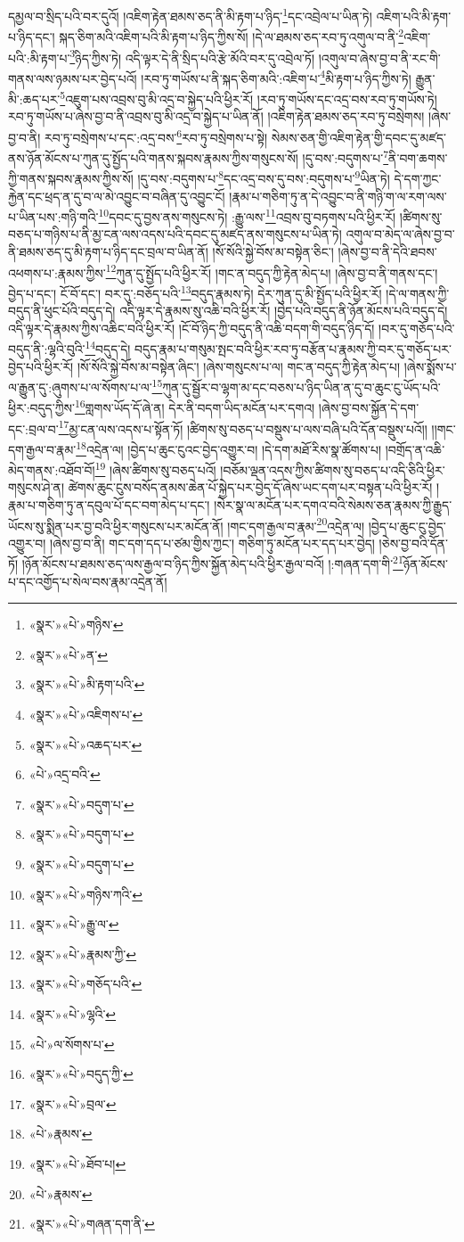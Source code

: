 དམྱལ་བ་སྲིད་པའི་བར་དུའོ། །འཇིག་རྟེན་ཐམས་ཅད་ནི་མི་རྟག་པ་ཉིད་\footnote{«སྣར་»«པེ་»གཉིས་}དང་འབྲེལ་པ་ཡིན་ཏེ། འཇིག་པའི་མི་རྟག་པ་ཉིད་དང་། སྐད་ཅིག་མའི་འཇིག་པའི་མི་རྟག་པ་ཉིད་ཀྱིས་སོ། །དེ་ལ་ཐམས་ཅད་རབ་ཏུ་འགུལ་བ་ནི་\footnote{«སྣར་»«པེ་»ན་}འཇིག་པའི་:མི་རྟག་པ་\footnote{«སྣར་»«པེ་»མི་རྟག་པའི་}ཉིད་ཀྱིས་ཏེ། འདི་ལྟར་དེ་ནི་སྲིད་པའི་རྩེ་མོའི་བར་དུ་འབྲེལ་ཏོ། །འགུལ་བ་ཞེས་བྱ་བ་ནི་རང་གི་གནས་ལས་ཉམས་པར་བྱེད་པའོ། །རབ་ཏུ་གཡོས་པ་ནི་སྐད་ཅིག་མའི་:འཇིག་པ་\footnote{«སྣར་»«པེ་»འཇིགས་པ་}མི་རྟག་པ་ཉིད་ཀྱིས་ཏེ། རྒྱུན་མི་:ཆད་པར་\footnote{«སྣར་»«པེ་»འཆད་པར་}འཇུག་པས་འབྲས་བུ་མི་འདྲ་བ་སྐྱེད་པའི་ཕྱིར་རོ། །རབ་ཏུ་གཡོས་དང་འདྲ་བས་རབ་ཏུ་གཡོས་ཏེ། རབ་ཏུ་གཡོས་པ་ཞེས་བྱ་བ་ནི་འབྲས་བུ་མི་འདྲ་བ་སྐྱེད་པ་ཡིན་ནོ། །འཇིག་རྟེན་ཐམས་ཅད་རབ་ཏུ་བསྲེགས། །ཞེས་བྱ་བ་ནི། རབ་ཏུ་བསྲེགས་པ་དང་:འདྲ་བས་\footnote{«པེ་»འདྲ་བའི་}རབ་ཏུ་བསྲེགས་པ་སྟེ། སེམས་ཅན་གྱི་འཇིག་རྟེན་གྱི་དབང་དུ་མཛད་ནས་ཉོན་མོངས་པ་ཀུན་དུ་སྤྱོད་པའི་གནས་སྐབས་རྣམས་ཀྱིས་གསུངས་སོ། །དུ་བས་:བདུགས་པ་\footnote{«སྣར་»«པེ་»བདུག་པ་}ནི་བག་ཆགས་ཀྱི་གནས་སྐབས་རྣམས་ཀྱིས་སོ། །དུ་བས་:བདུགས་པ་\footnote{«སྣར་»«པེ་»བདུག་པ་}དང་འདྲ་བས་དུ་བས་:བདུགས་པ་\footnote{«སྣར་»«པེ་»བདུག་པ་}ཡིན་ཏེ། དེ་དག་ཀྱང་རྐྱེན་དང་ཕྲད་ན་དུ་བ་ལ་མེ་འབྱུང་བ་བཞིན་དུ་འབྱུང་ངོ། །རྣམ་པ་གཅིག་ཏུ་ན་དེ་འབྱུང་བ་ནི་གཉི་ག་ལ་རག་ལས་པ་ཡིན་པས་:གཉི་གའི་\footnote{«སྣར་»«པེ་»གཉིས་ཀའི་}དབང་དུ་བྱས་ནས་གསུངས་ཏེ། :རྒྱུ་ལས་\footnote{«སྣར་»«པེ་»རྒྱུ་ལ་}འབྲས་བུ་བཏགས་པའི་ཕྱིར་རོ། །ཚིགས་སུ་བཅད་པ་གཉིས་པ་ནི་མྱ་ངན་ལས་འདས་པའི་དབང་དུ་མཛད་ནས་གསུངས་པ་ཡིན་ཏེ། འགུལ་བ་མེད་ལ་ཞེས་བྱ་བ་ནི་ཐམས་ཅད་དུ་མི་རྟག་པ་ཉིད་དང་བྲལ་བ་ཡིན་ནོ། །སོ་སོའི་སྐྱེ་བོས་མ་བསྟེན་ཅིང་། །ཞེས་བྱ་བ་ནི་དེའི་ཐབས་འཕགས་པ་:རྣམས་ཀྱིས་\footnote{«སྣར་»«པེ་»རྣམས་ཀྱི་}ཀུན་དུ་སྤྱོད་པའི་ཕྱིར་རོ། །གང་ན་བདུད་ཀྱི་རྟེན་མེད་པ། །ཞེས་བྱ་བ་ནི་གནས་དང་། བྱེད་པ་དང་། ངོ་བོ་དང་། བར་དུ་:བཅོད་པའི་\footnote{«སྣར་»«པེ་»གཅོད་པའི་}བདུད་རྣམས་ཏེ། དེར་ཀུན་དུ་མི་སྤྱོད་པའི་ཕྱིར་རོ། །དེ་ལ་གནས་ཀྱི་བདུད་ནི་ཕུང་པོའི་བདུད་དེ། འདི་ལྟར་དེ་རྣམས་སུ་འཆི་བའི་ཕྱིར་རོ། །བྱེད་པའི་བདུད་ནི་ཉོན་མོངས་པའི་བདུད་དེ། འདི་ལྟར་དེ་རྣམས་ཀྱིས་འཆིང་བའི་ཕྱིར་རོ། །ངོ་བོ་ཉིད་ཀྱི་བདུད་ནི་འཆི་བདག་གི་བདུད་ཉིད་དོ། །བར་དུ་གཅོད་པའི་བདུད་ནི་:ལྷའི་བུའི་\footnote{«སྣར་»«པེ་»ལྷའི་}བདུད་དེ། བདུད་རྣམ་པ་གསུམ་སྤང་བའི་ཕྱིར་རབ་ཏུ་བརྩོན་པ་རྣམས་ཀྱི་བར་དུ་གཅོད་པར་བྱེད་པའི་ཕྱིར་རོ། །སོ་སོའི་སྐྱེ་བོས་མ་བསྟེན་ཞིང་། །ཞེས་གསུངས་པ་ལ། གང་ན་བདུད་ཀྱི་རྟེན་མེད་པ། །ཞེས་སྨོས་པ་ལ་རྒྱུན་དུ་:ཞུགས་པ་ལ་སོགས་པ་ལ་\footnote{«པེ་»ལ་སོགས་པ་}ཀུན་དུ་སྦྱོར་བ་ལྷག་མ་དང་བཅས་པ་ཉིད་ཡིན་ན་དུ་བ་ཆུང་ངུ་ཡོད་པའི་ཕྱིར་:བདུད་ཀྱིས་\footnote{«སྣར་»«པེ་»བདུད་ཀྱི་}གླགས་ཡོད་དོ་ཞེ་ན། དེར་ནི་བདག་ཡིད་མངོན་པར་དགའ། །ཞེས་བྱ་བས་སྐྱོན་དེ་དག་དང་:བྲལ་བ་\footnote{«སྣར་»«པེ་»བྲལ་}མྱ་ངན་ལས་འདས་པ་སྟོན་ཏོ། །ཚིགས་སུ་བཅད་པ་བསྡུས་པ་ལས་བཞི་པའི་དོན་བསྡུས་པའོ།། །།གང་དག་རྒྱལ་བ་རྣམ་\footnote{«པེ་»རྣམས་}འདྲེན་ལ། །བྱེད་པ་ཆུང་ངུའང་བྱེད་འགྱུར་བ། །དེ་དག་མཐོ་རིས་སྣ་ཚོགས་པ། །བགྲོད་ན་འཆི་མེད་གནས་:འཐོབ་བོ།\footnote{«སྣར་»«པེ་»ཐོབ་པ།} །ཞེས་ཚིགས་སུ་བཅད་པའོ། །བཅོམ་ལྡན་འདས་ཀྱིས་ཚིགས་སུ་བཅད་པ་འདི་ཅིའི་ཕྱིར་གསུངས་ཤེ་ན། ཚེགས་ཆུང་ངུས་བསོད་ནམས་ཆེན་པོ་སྐྱེད་པར་བྱེད་དོ་ཞེས་ཡང་དག་པར་བསྟན་པའི་ཕྱིར་རོ། །རྣམ་པ་གཅིག་ཏུ་ན་དབུལ་པོ་དང་བག་མེད་པ་དང་། །སེར་སྣ་ལ་མངོན་པར་དགའ་བའི་སེམས་ཅན་རྣམས་ཀྱི་རྒྱུད་ཡོངས་སུ་སྨིན་པར་བྱ་བའི་ཕྱིར་གསུངས་པར་མངོན་ནོ། །གང་དག་རྒྱལ་བ་རྣམ་\footnote{«པེ་»རྣམས་}འདྲེན་ལ། །བྱེད་པ་ཆུང་ངུ་བྱེད་འགྱུར་བ། །ཞེས་བྱ་བ་ནི། གང་དག་དད་པ་ཙམ་གྱིས་ཀྱང་། གཅིག་ཏུ་མངོན་པར་དད་པར་བྱེད། །ཅེས་བྱ་བའི་དོན་ཏོ། །ཉོན་མོངས་པ་ཐམས་ཅད་ལས་རྒྱལ་བ་ཉིད་ཀྱིས་སྐྱོན་མེད་པའི་ཕྱིར་རྒྱལ་བའོ། །:གཞན་དག་གི་\footnote{«སྣར་»«པེ་»གཞན་དག་ནི་}ཉོན་མོངས་པ་དང་འགྱོད་པ་སེལ་བས་རྣམ་འདྲེན་ནོ། 